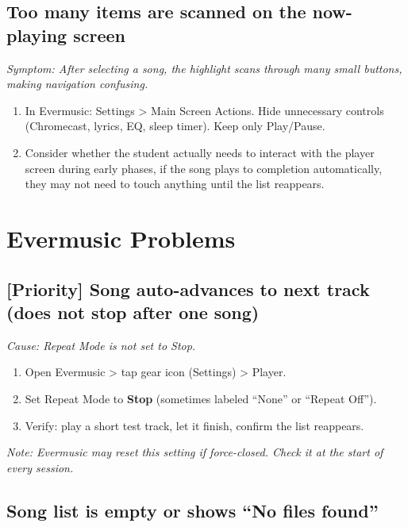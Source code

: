 \documentclass[justified,openright]{tufte-book}
\begin{document}
\subsection{Too many items are scanned on the now-playing
screen}\label{too-many-items-are-scanned-on-the-now-playing-screen}

\emph{Symptom: After selecting a song, the highlight scans through many
small buttons, making navigation confusing.}

\begin{enumerate}
\item
  In Evermusic: Settings \textgreater{} Main Screen Actions. Hide
  unnecessary controls (Chromecast, lyrics, EQ, sleep timer). Keep only
  Play/Pause.
\item
  Consider whether the student actually needs to interact with the
  player screen during early phases, if the song plays to completion
  automatically, they may not need to touch anything until the list
  reappears.
\end{enumerate}

\section{Evermusic Problems}\label{evermusic-problems}

\subsection{[Priority] Song auto-advances to next track (does not stop after
one
song)}\label{song-auto-advances-to-next-track-does-not-stop-after-one-song}

\emph{Cause: Repeat Mode is not set to Stop.}

\begin{enumerate}
\item
  Open Evermusic \textgreater{} tap gear icon (Settings) \textgreater{}
  Player.
\item
  Set Repeat Mode to \textbf{Stop} (sometimes labeled ``None'' or
  ``Repeat Off'').
\item
  Verify: play a short test track, let it finish, confirm the list
  reappears.
\end{enumerate}

\emph{Note: Evermusic may reset this setting if force-closed. Check it
at the start of every session.}

\subsection{Song list is empty or shows ``No files
found''}\label{song-list-is-empty-or-shows-no-files-found}
\end{document}
